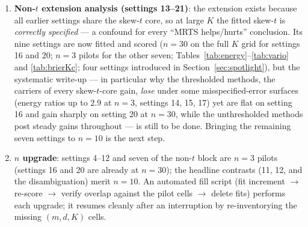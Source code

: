 \documentclass[11pt]{article}
\begin{document}
\begin{enumerate}
\item \textbf{Non-$t$ extension analysis (settings 13--21)}: the extension
exists because all earlier settings share the skew-$t$ core, so at large $K$
the fitted skew-$t$ is \emph{correctly specified} --- a confound for every
``MRTS helps/hurts'' conclusion. Its nine settings are now fitted and scored
($n = 30$ on the full $K$ grid for settings 16 and 20; $n = 3$ pilots for the
other seven; Tables~\ref{tab:energy}--\ref{tab:vario} and \ref{tab:brierKc};
four settings introduced in Section~\ref{sec:spotlight}), but the systematic
write-up --- in particular why the thresholded methods, the carriers of every
skew-$t$-core gain, \emph{lose} under some misspecified-error surfaces (energy
ratios up to $2.9$ at $n = 3$, settings 14, 15, 17) yet are flat on setting 16
and gain sharply on setting 20 at $n = 30$, while the unthresholded methods
post steady gains throughout --- is still to be done. Bringing the remaining
seven settings to $n = 10$ is the next step.
\item \textbf{$n$ upgrade}: settings 4--12 and seven of the non-$t$ block are
$n = 3$ pilots (settings 16 and 20 are already at $n = 30$); the headline
contrasts (11, 12, and the disambiguation) merit $n = 10$. An automated fill
script (fit increment $\to$ re-score $\to$ verify overlap against the pilot
cells $\to$ delete fits) performs each upgrade; it resumes cleanly after an
interruption by re-inventorying the missing $(m, d, K)$ cells.
\end{enumerate}
\end{document}
